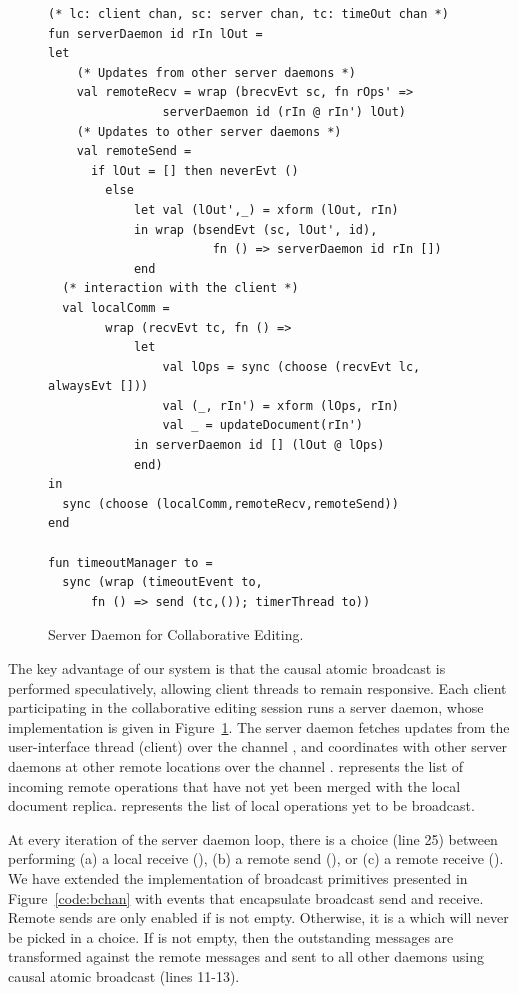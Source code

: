 \begin{figure}[t]
\begin{lstlisting}
(* lc: client chan, sc: server chan, tc: timeOut chan *)
fun serverDaemon id rIn lOut =
let
	(* Updates from other server daemons *)
	val remoteRecv = wrap (brecvEvt sc, fn rOps' =>
				serverDaemon id (rIn @ rIn') lOut)
	(* Updates to other server daemons *)
	val remoteSend =
	  if lOut = [] then neverEvt ()
		else
			let val (lOut',_) = xform (lOut, rIn)
			in wrap (bsendEvt (sc, lOut', id),
  					   fn () => serverDaemon id rIn [])
			end
  (* interaction with the client *)
  val localComm =
		wrap (recvEvt tc, fn () =>
			let
				val lOps = sync (choose (recvEvt lc, alwaysEvt []))
				val (_, rIn') = xform (lOps, rIn)
				val _ = updateDocument(rIn')
			in serverDaemon id [] (lOut @ lOps)
			end)
in
  sync (choose (localComm,remoteRecv,remoteSend))
end

fun timeoutManager to =
  sync (wrap (timeoutEvent to,
	  fn () => send (tc,()); timerThread to))
\end{lstlisting}
\caption{Server Daemon for Collaborative Editing.}
\label{code:serverDaemon}
\end{figure}

The key advantage of our system is that the causal atomic broadcast is
performed speculatively, allowing client threads to remain responsive. Each
client participating in the collaborative editing session runs a server daemon,
whose implementation is given in Figure~\ref{code:serverDaemon}. The server
daemon fetches updates from the user-interface thread (client) over the channel
, and coordinates with other server daemons at other remote locations
over the channel .   represents the list of incoming remote
operations that have not yet been merged with the local document replica.
 represents the list of local operations yet to be broadcast.

At every iteration of the server daemon loop, there is a choice (line 25)
between performing (a) a local receive (), (b) a remote send
(), or (c) a remote receive (). We have extended
the implementation of broadcast primitives presented in Figure~\ref{code:bchan}
with events that encapsulate broadcast send and receive. Remote sends are only
enabled if  is not empty. Otherwise, it is a  which
will never be picked in a choice. If  is not empty, then the
outstanding messages are transformed against the remote messages and sent to
all other daemons using causal atomic broadcast (lines 11-13).

